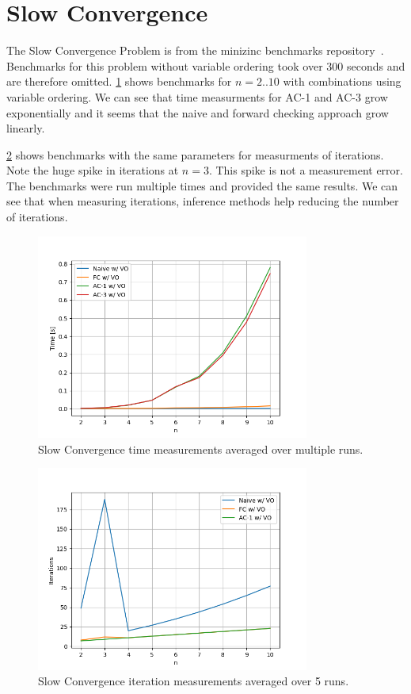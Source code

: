 \section{Slow Convergence}

The Slow Convergence Problem is from the minizinc benchmarks repository~\cite{minizinc_slow:2018}. Benchmarks for this problem without variable ordering took over 300 seconds and are therefore omitted. \cref{fig:slow:time-small} shows benchmarks for $n=2..10$ with combinations using variable ordering. We can see that time measurments for AC-1 and AC-3 grow exponentially and it seems that the naive and forward checking approach grow linearly.

\cref{fig:slow:iterations-small} shows benchmarks with the same parameters for measurments of iterations. Note the huge spike in iterations at $n = 3$. This spike is not a measurement error. The benchmarks were run multiple times and provided the same results. We can see that when measuring iterations, inference methods help reducing the number of iterations.

\begin{figure}[ht]
	\centering
	\includegraphics[width=0.8\textwidth]{./Problems/slow_convergence/plots/time_small.png}
	\caption{Slow Convergence time measurements averaged over multiple runs.}
	\label{fig:slow:time-small}
\end{figure}

\begin{figure}[ht]
	\centering
	\includegraphics[width=0.8\textwidth]{./Problems/slow_convergence/plots/iterations_small.png}
	\caption{Slow Convergence iteration measurements averaged over 5 runs.}
	\label{fig:slow:iterations-small}
\end{figure}

